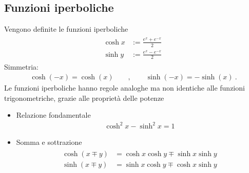 \documentclass[letterpaper,10pt,italian]{jupyterBook}
\begin{document}
\subsection{Funzioni iperboliche}
\label{\detokenize{ch/precalculus/exponential_logarithm:funzioni-iperboliche}}\label{\detokenize{ch/precalculus/exponential_logarithm:math-hs-exp-def-hyp}}
\sphinxAtStartPar
Vengono definite le funzioni iperboliche
\begin{equation*}
\begin{split}\begin{aligned}
  \cosh x & := \frac{e^x + e^{-x}}{2} \\
  \sinh y & := \frac{e^x - e^{-x}}{2} \ 
\end{aligned}\end{split}
\end{equation*}
\sphinxAtStartPar
{}
Simmetria:
\begin{equation*}
\begin{split}\cosh(-x) = \cosh(x) \qquad , \qquad \sinh(-x) = - \sinh(x) \ .\end{split}
\end{equation*}
\sphinxAtStartPar
Le funzioni iperboliche hanno regole analoghe \sphinxhyphen{} ma non identiche \sphinxhyphen{} alle funzioni trigonometriche, {\hyperref[\detokenize{ch/precalculus/exponential_logarithm-notes:math-hs-exp-log-notes-hyp}]{}} grazie alle proprietà delle potenze
\begin{itemize}
\item {} 
\sphinxAtStartPar
Relazione fondamentale
\begin{equation*}
\begin{split}\cosh^2 x - \sinh^2 x = 1\end{split}
\end{equation*}
\item {} 
\sphinxAtStartPar
Somma e sottrazione
\begin{equation*}
\begin{split}\begin{aligned}
    \cosh(x \mp y) & = \cosh x \cosh y \mp \sinh x \sinh y \\
    \sinh(x \mp y) & = \sinh x \cosh y \mp \cosh x \sinh y 
  \end{aligned}\end{split}
\end{equation*}
\end{itemize}
\end{document}
